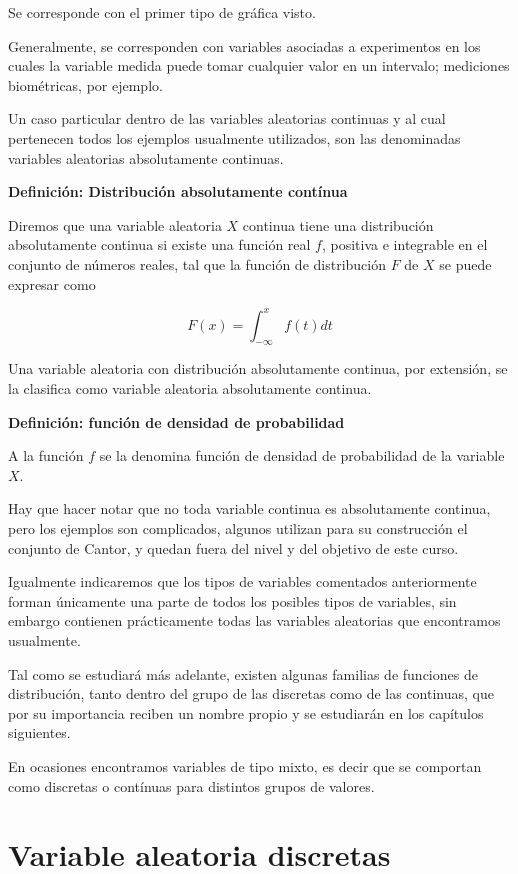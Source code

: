 \documentclass[
  a4paper,
  DIV=11,
  numbers=noendperiod]{scrreprt}
\begin{document}
Se corresponde con el primer tipo de gráfica visto.

Generalmente, se corresponden con variables asociadas a experimentos en
los cuales la variable medida puede tomar cualquier valor en un
intervalo; mediciones biométricas, por ejemplo.

Un caso particular dentro de las variables aleatorias continuas y al
cual pertenecen todos los ejemplos usualmente utilizados, son las
denominadas variables aleatorias absolutamente continuas.

\textbf{Definición: Distribución absolutamente contínua}

Diremos que una variable aleatoria \(X\) continua tiene una distribución
absolutamente continua si existe una función real \(f\), positiva e
integrable en el conjunto de números reales, tal que la función de
distribución \(F\) de \(X\) se puede expresar como

\[
F(x)=\int_{-\infty}^{x} f(t) d t
\]

Una variable aleatoria con distribución absolutamente continua, por
extensión, se la clasifica como variable aleatoria absolutamente
continua.

\textbf{Definición: función de densidad de probabilidad}

A la función \(f\) se la denomina función de densidad de probabilidad de
la variable \(X\).

Hay que hacer notar que no toda variable continua es absolutamente
continua, pero los ejemplos son complicados, algunos utilizan para su
construcción el conjunto de Cantor, y quedan fuera del nivel y del
objetivo de este curso.

Igualmente indicaremos que los tipos de variables comentados
anteriormente forman únicamente una parte de todos los posibles tipos de
variables, sin embargo contienen prácticamente todas las variables
aleatorias que encontramos usualmente.

Tal como se estudiará más adelante, existen algunas familias de
funciones de distribución, tanto dentro del grupo de las discretas como
de las continuas, que por su importancia reciben un nombre propio y se
estudiarán en los capítulos siguientes.

En ocasiones encontramos variables de tipo mixto, es decir que se
comportan como discretas o contínuas para distintos grupos de valores.

\section{Variable aleatoria
discretas}\label{variable-aleatoria-discretas}
\end{document}
